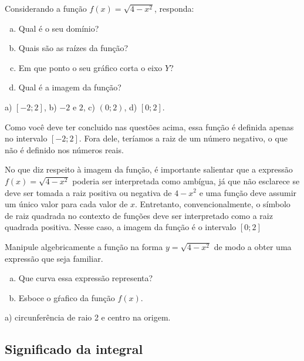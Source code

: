 \documentclass[main_estudante.tex]{subfiles}
\begin{document}
\begin{questao}
Considerando a função $f(x)=\sqrt{4-x^2}$, responda:
\begin{enumerate}[a)]
\item Qual é o seu domínio?
\item Quais são as raízes da função?
\item Em que ponto o seu gráfico corta o eixo $Y$?
\item Qual é a imagem da função?
\end{enumerate}
\end{questao}

\begin{gabarito}
	\begin{gabaritoQuestao}
		a) $[-2;2]$, b) $-2$ e $2$, c) $(0;2)$, d) $[0;2]$.
	\end{gabaritoQuestao}
\end{gabarito}

Como você deve ter concluido nas questões acima, essa função é definida apenas no intervalo $[-2;2]$. Fora dele, teríamos a raiz de um número negativo, o que não é definido nos números reais.

No que diz respeito à imagem da função, é importante salientar que a expressão $f(x)=\sqrt{4-x^2}$ poderia ser interpretada como ambígua, já que não esclarece se deve ser tomada a raiz positiva ou negativa de $4-x^2$ e uma função deve assumir um único valor para cada valor de $x$. Entretanto, convencionalmente, o símbolo de raiz quadrada no contexto de funções deve ser interpretado como a raiz quadrada positiva. Nesse caso, a imagem da função é o intervalo $[0;2]$

\begin{questao}
Manipule algebricamente a função na forma $y=\sqrt{4-x^2}$ de modo a obter uma expressão que seja familiar. 
\begin{enumerate}[a)]
\item Que curva essa expressão representa?
\item Esboce o gŕafico da função $f(x)$.
\end{enumerate}
\end{questao}

\begin{gabarito}
	\begin{gabaritoQuestao}
		a) circunferência de raio 2 e centro na origem.
	\end{gabaritoQuestao}
\end{gabarito}

\subsection*{Significado da integral}
\end{document}
